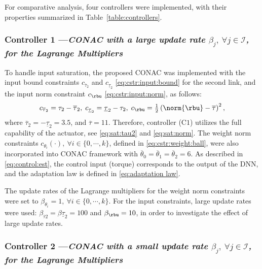 \documentclass[letterpaper, journal]{IEEEtran}
\begin{document}
For comparative analysis, four controllers were implemented, with their properties summarized in Table~\ref{table:controllers}.

\subsubsection*{Controller 1 —\textit{CONAC with a large update rate $\beta_j,\ \forall j\in\mathcal{I}$, for the Lagrange Multipliers}}

To handle input saturation, the proposed CONAC was implemented with the input bound constraints $c_{\overline\tau_2}$ and $c_{\underline\tau_2}$ \eqref{eq:cstr:input:bound} for the second link, and the input norm constraint $c_{\rbu}$ \eqref{eq:cstr:input:norm}, as follows:
\begin{equation}
    c_{\overline\tau_2}     
    =
    \tau_2-\overline\tau_2
    ,
    \;
    c_{\underline\tau_2} 
    =
    \underline\tau_2-\tau_2
    ,
    \;
    c_{\rbu}
    =
    \tfrac{1}{2}
    \left(
        \norm{\rbu}-\overline\tau
    \right)^2 
    ,
    \label{eq:sim:cstr:CONAC}
\end{equation}
where $\overline\tau_2=-\underline{\tau}_2=3.5$, and $\overline\tau=11$.
Therefore, controller (C$1$) utilizes the full capability of the actuator, see \eqref{eq:sat:tau2} and \eqref{eq:sat:norm}.
The weight norm constraints $c_{\theta_i}(\cdot),\ \forall i\in\{0,\cdots,k\}$, defined in \eqref{eq:cstr:weight:ball}, were also incorporated into CONAC framework with $\overline\theta_0=\overline\theta_1=\overline\theta_2=6$.
As described in \eqref{eq:control:est}, the control input (torque) corresponds to the output of the DNN, and the adaptation law is defined in \eqref{eq:adaptation law}.

The update rates of the Lagrange multipliers for the weight norm constraints were set to $\beta_{\theta_i}=1,\ \forall i\in\{0,\cdots,k\}$.
For the input constraints, large update rates were used: $\beta_{\overline{\tau}2} = \beta{\underline{\tau}_2} = 100$ and $\beta_{\rbu} = 10$, in order to investigate the effect of large update rates.

\subsubsection*{Controller 2 —\textit{CONAC with a small update rate $\beta_j,\ \forall j\in\mathcal{I}$, for the Lagrange Multipliers}}
\end{document}
